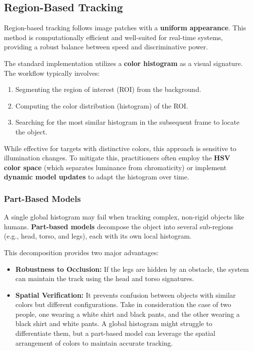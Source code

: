 \subsection{Region-Based Tracking}
Region-based tracking follows image patches with a \textbf{uniform appearance}. 
This method is computationally efficient and well-suited for real-time systems, providing a robust balance
between speed and discriminative power.

The standard implementation utilizes a \textbf{color histogram} as a visual signature. 
The workflow typically involves:
\begin{enumerate}
    \item Segmenting the region of interest (ROI) from the background.
    \item Computing the color distribution (histogram) of the ROI.
    \item Searching for the most similar histogram in the subsequent frame to locate the object.
\end{enumerate}

While effective for targets with distinctive colors, this approach is sensitive to illumination changes. 
To mitigate this, practitioners often employ the \textbf{HSV color space} (which separates luminance from chromaticity) 
or implement \textbf{dynamic model updates} to adapt the histogram over time.

\subsubsection{Part-Based Models}
A single global histogram may fail when tracking complex, non-rigid objects like humans. 
\textbf{Part-based models} decompose the object into several sub-regions (e.g., head, torso, and legs), 
each with its own local histogram.

This decomposition provides two major advantages:
\begin{itemize}
    \item \textbf{Robustness to Occlusion:} If the legs are hidden by an obstacle, 
    the system can maintain the track using the head and torso signatures.
    \item \textbf{Spatial Verification:} It prevents confusion between objects with similar colors but different 
    configurations. Take in consideration the case of two people, one wearing a white shirt and black pants, 
    and the other wearing a black shirt and white pants. A global histogram might struggle to differentiate them, 
    but a part-based model can leverage the spatial arrangement of colors to maintain accurate tracking.
\end{itemize}

